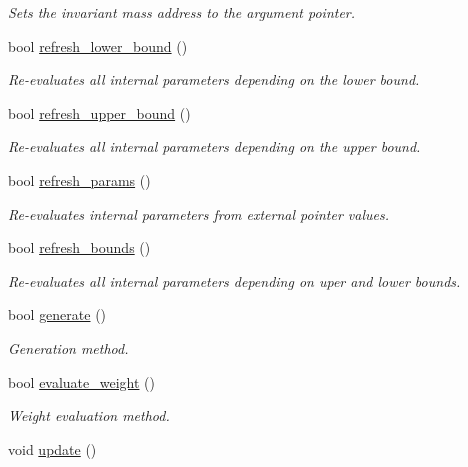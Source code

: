 \begin{DoxyCompactItemize}
\begin{DoxyCompactList}\small\item\em Sets the invariant mass address to the argument pointer. \end{DoxyCompactList}\item 
bool \hyperlink{a00001_a4d4bd3b524a004dba5e01790182817cf}{refresh\+\_\+lower\+\_\+bound} ()
\begin{DoxyCompactList}\small\item\em Re-\/evaluates all internal parameters depending on the lower bound. \end{DoxyCompactList}\item 
bool \hyperlink{a00001_ad40f7085df9948494142cfe196ae8ffe}{refresh\+\_\+upper\+\_\+bound} ()
\begin{DoxyCompactList}\small\item\em Re-\/evaluates all internal parameters depending on the upper bound. \end{DoxyCompactList}\item 
bool \hyperlink{a00001_ab5f62076a8a9d79d279f99fc05d6758f}{refresh\+\_\+params} ()
\begin{DoxyCompactList}\small\item\em Re-\/evaluates internal parameters from external pointer values. \end{DoxyCompactList}\item 
bool \hyperlink{a00001_a995493aac48a6e64d7447a51f6381014}{refresh\+\_\+bounds} ()
\begin{DoxyCompactList}\small\item\em Re-\/evaluates all internal parameters depending on uper and lower bounds. \end{DoxyCompactList}\item 
\hypertarget{a00001_a11e0685ef5d48c65f96a514a87be6c89}{}bool \hyperlink{a00001_a11e0685ef5d48c65f96a514a87be6c89}{generate} ()\label{a00001_a11e0685ef5d48c65f96a514a87be6c89}

\begin{DoxyCompactList}\small\item\em Generation method. \end{DoxyCompactList}\item 
\hypertarget{a00001_ab64755600736633e44bcaf202f7ef5ce}{}bool \hyperlink{a00001_ab64755600736633e44bcaf202f7ef5ce}{evaluate\+\_\+weight} ()\label{a00001_ab64755600736633e44bcaf202f7ef5ce}

\begin{DoxyCompactList}\small\item\em Weight evaluation method. \end{DoxyCompactList}\item 
\hypertarget{a00001_a30fd5b09335a0e7903555065c78d1ce8}{}void \hyperlink{a00001_a30fd5b09335a0e7903555065c78d1ce8}{update} ()\label{a00001_a30fd5b09335a0e7903555065c78d1ce8}


\end{DoxyCompactItemize}

